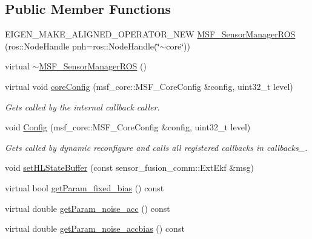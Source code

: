 \subsection*{Public Member Functions}
\begin{DoxyCompactItemize}
\item 
E\-I\-G\-E\-N\-\_\-\-M\-A\-K\-E\-\_\-\-A\-L\-I\-G\-N\-E\-D\-\_\-\-O\-P\-E\-R\-A\-T\-O\-R\-\_\-\-N\-E\-W \hyperlink{structmsf__core_1_1MSF__SensorManagerROS_a1d665e46ae9945ab6a129575c4400bd3}{M\-S\-F\-\_\-\-Sensor\-Manager\-R\-O\-S} (ros\-::\-Node\-Handle pnh=ros\-::\-Node\-Handle(\char`\"{}$\sim$core\char`\"{}))
\item 
virtual \hyperlink{structmsf__core_1_1MSF__SensorManagerROS_a8bc5f186d4c8c36e5462aeca24cce391}{$\sim$\-M\-S\-F\-\_\-\-Sensor\-Manager\-R\-O\-S} ()
\item 
virtual void \hyperlink{structmsf__core_1_1MSF__SensorManagerROS_a092e5cecd4d0586303c0412e55959603}{core\-Config} (msf\-\_\-core\-::\-M\-S\-F\-\_\-\-Core\-Config \&config, uint32\-\_\-t level)
\begin{DoxyCompactList}\small\item\em Gets called by the internal callback caller. \end{DoxyCompactList}\item 
void \hyperlink{structmsf__core_1_1MSF__SensorManagerROS_a05d1f96502e2733ac5d9810f4dd55706}{Config} (msf\-\_\-core\-::\-M\-S\-F\-\_\-\-Core\-Config \&config, uint32\-\_\-t level)
\begin{DoxyCompactList}\small\item\em Gets called by dynamic reconfigure and calls all registered callbacks in callbacks\-\_\-. \end{DoxyCompactList}\item 
void \hyperlink{structmsf__core_1_1MSF__SensorManagerROS_a4b28905e8303ca5d74a2711c6483329c}{set\-H\-L\-State\-Buffer} (const sensor\-\_\-fusion\-\_\-comm\-::\-Ext\-Ekf \&msg)
\item 
virtual bool \hyperlink{structmsf__core_1_1MSF__SensorManagerROS_a25e296341f9628b7e0c5616d09b1830b}{get\-Param\-\_\-fixed\-\_\-bias} () const 
\item 
virtual double \hyperlink{structmsf__core_1_1MSF__SensorManagerROS_a8832a1f48d484a04120c32bf1ffa2b63}{get\-Param\-\_\-noise\-\_\-acc} () const 
\item 
virtual double \hyperlink{structmsf__core_1_1MSF__SensorManagerROS_a73d7709e65b947e02a8080b65c6d3e7a}{get\-Param\-\_\-noise\-\_\-accbias} () const 
\item 

\end{DoxyCompactItemize}
